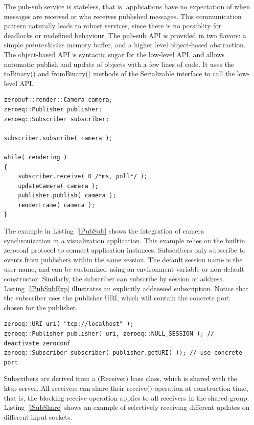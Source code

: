 \documentclass[10pt]{llncs}
\newcommand{\lref}[1]{Listing~\ref{#1}}
\begin{document}
The pub-sub service is stateless, that is, applications have no expectation of
when messages are received or who receives published messages. This
communication pattern naturally leads to robust services, since there is no
possiblity for deadlocks or undefined behaviour. The pub-sub API is provided in
two flavors: a simple $pointer \& size$ memory buffer, and a higher level
object-based abstraction. The object-based API is syntactic sugar for the
low-level API, and allows automatic publish and update of objects with a few
lines of code. It uses the \textsf{toBinary()} and \textsf{fromBinary()} methods
of the \textsf{Serializable} interface to call the low-level API.

\begin{lstlisting}[float, caption=Publish-Subscribe Example, label=lPubSub]
zerobuf::render::Camera camera;
zeroeq::Publisher publisher;
zeroeq::Subscriber subscriber;

subscriber.subscribe( camera );

while( rendering )
{
    subscriber.receive( 0 /*ms, poll*/ );
    updateCamera( camera );
    publisher.publish( camera );
    renderFrame( camera );
}
\end{lstlisting}

The example in \lref{lPubSub} shows the integration of camera
synchronization in a visualization application. This example relies on the
builtin zeroconf protocol to connect application instances. Subscribers only
subscribe to events from publishers within the same session. The default
session name is the user name, and can be customized using an environment
variable or non-default constructor. Similarly, the subscriber can subscribe by
session or address. \lref{lPubSubExp} illustrates an explicitly addressed
subscription. Notice that the subscriber uses the publisher URI, which will
contain the concrete port chosen for the publisher.

\begin{lstlisting}[float, caption=Explicit Addressing,label=lPubSubExp]
zeroeq::URI uri( "tcp://localhost" );
zeroeq::Publisher publisher( uri, zeroeq::NULL_SESSION ); // deactivate zeroconf
zeroeq::Subscriber subscriber( publisher.getURI( )); // use concrete port
\end{lstlisting}

Subscribers are derived from a \textsf(Receiver) base class, which is shared
with the http server. All receivers can share their \textsf{receive()}
operation at construction time, that is, the blocking receive operation applies
to all receivers in the shared group. \lref{lSubShare} shows an example of
selectively receiving different updates on different input sockets.
\end{document}
